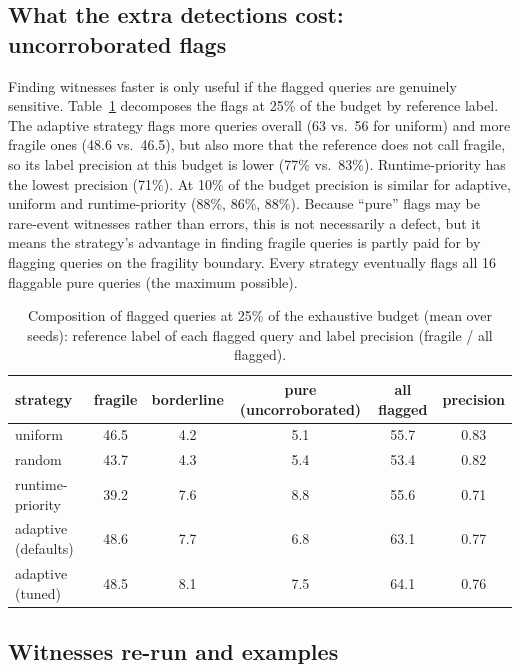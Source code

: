 \documentclass[11pt]{article}
\begin{document}
\subsection{What the extra detections cost: uncorroborated flags}

Finding witnesses faster is only useful if the flagged queries are genuinely sensitive. Table~\ref{tab:flags} decomposes the flags at 25\% of the budget by reference label. The adaptive strategy flags more queries overall (63 vs.\ 56 for uniform) and more fragile ones (48.6 vs.\ 46.5), but also more that the reference does not call fragile, so its label precision at this budget is lower (77\% vs.\ 83\%). Runtime-priority has the lowest precision (71\%). At 10\% of the budget precision is similar for adaptive, uniform and runtime-priority (88\%, 86\%, 88\%). Because ``pure'' flags may be rare-event witnesses rather than errors, this is not necessarily a defect, but it means the strategy's advantage in finding fragile queries is partly paid for by flagging queries on the fragility boundary. Every strategy eventually flags all 16 flaggable pure queries (the maximum possible).

\begin{table}[t]
\centering
\caption{Composition of flagged queries at 25\% of the exhaustive budget (mean over seeds): reference label of each flagged query and label precision (fragile / all flagged).}
\label{tab:flags}
\small
\begin{tabular}{lccccc}
\toprule
strategy & fragile & borderline & pure (uncorroborated) & all flagged & precision\\
\midrule
uniform & 46.5 & 4.2 & 5.1 & 55.7 & 0.83\\
random & 43.7 & 4.3 & 5.4 & 53.4 & 0.82\\
runtime-priority & 39.2 & 7.6 & 8.8 & 55.6 & 0.71\\
adaptive (defaults) & 48.6 & 7.7 & 6.8 & 63.1 & 0.77\\
adaptive (tuned) & 48.5 & 8.1 & 7.5 & 64.1 & 0.76\\
\bottomrule
\end{tabular}
\end{table}

\subsection{Witnesses re-run and examples}
\end{document}
